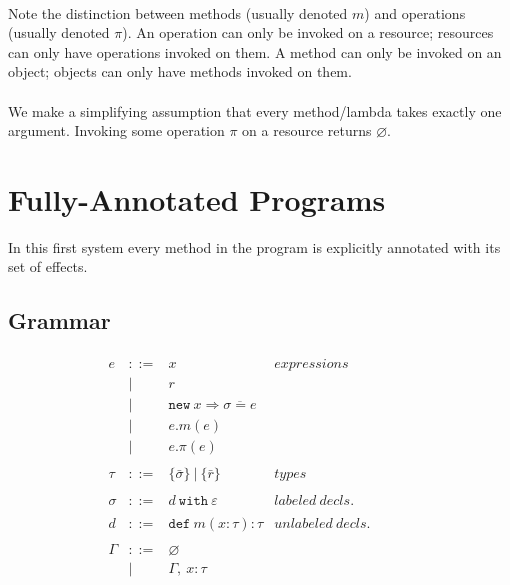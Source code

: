 \documentclass{llncs}
\newcommand{\keywadj}[1]{\mathtt{#1}}
\newcommand{\keyw}[1]{\keywadj{#1}~}
\begin{document}
\paragraph{}
Note the distinction between methods (usually denoted $m$) and operations (usually denoted $\pi$). An operation can only be invoked on a resource; resources can only have operations invoked on them. A method can only be invoked on an object; objects can only have methods invoked on them.

\paragraph{}
We make a simplifying assumption that every method/lambda takes exactly one argument. Invoking some operation $\pi$ on a resource returns $\varnothing$.

\newpage

\section{Fully-Annotated Programs}

In this first system every method in the program is explicitly annotated with its set of effects.

\subsection{Grammar}

\[
\begin{array}{lll}
\begin{array}{lllr}

	e & ::= & x & expressions \\
  		& | & r \\
  		& | & \keywadj{new}~x \Rightarrow \overline{\sigma = e} \\
  		& | & e.m(e)\\
  		& | & e.\pi(e)\\
		&&\\

	\tau & ::= & \{ \bar \sigma \} ~ | ~ \{ \bar r \} & types \\
		&&\\

	\sigma & ::= & d~\keyw{with}\varepsilon  & labeled~ decls.\\
		&&\\
		
	d & ::= & \keyw{def} m(x:\tau):\tau & unlabeled~decls.\\		&&\\
		
	\Gamma & ::= & \varnothing \\
		& | & \Gamma,~x : \tau\\
		&&\\

\end{array}
& ~~~~~~
&
\end{array}
\]
\end{document}
